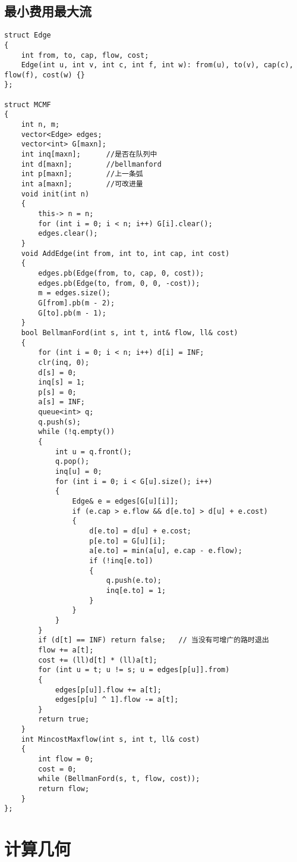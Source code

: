 \documentclass[a4]{article}
\begin{document}
\subsection{最小费用最大流}
\begin{lstlisting}
struct Edge
{
    int from, to, cap, flow, cost;
    Edge(int u, int v, int c, int f, int w): from(u), to(v), cap(c), flow(f), cost(w) {}
};

struct MCMF
{
    int n, m;
    vector<Edge> edges;
    vector<int> G[maxn];
    int inq[maxn];      //是否在队列中
    int d[maxn];        //bellmanford
    int p[maxn];        //上一条弧
    int a[maxn];        //可改进量
    void init(int n)
    {
        this-> n = n;
        for (int i = 0; i < n; i++) G[i].clear();
        edges.clear();
    }
    void AddEdge(int from, int to, int cap, int cost)
    {
        edges.pb(Edge(from, to, cap, 0, cost));
        edges.pb(Edge(to, from, 0, 0, -cost));
        m = edges.size();
        G[from].pb(m - 2);
        G[to].pb(m - 1);
    }
    bool BellmanFord(int s, int t, int& flow, ll& cost)
    {
        for (int i = 0; i < n; i++) d[i] = INF;
        clr(inq, 0);
        d[s] = 0;
        inq[s] = 1;
        p[s] = 0;
        a[s] = INF;
        queue<int> q;
        q.push(s);
        while (!q.empty())
        {
            int u = q.front();
            q.pop();
            inq[u] = 0;
            for (int i = 0; i < G[u].size(); i++)
            {
                Edge& e = edges[G[u][i]];
                if (e.cap > e.flow && d[e.to] > d[u] + e.cost)
                {
                    d[e.to] = d[u] + e.cost;
                    p[e.to] = G[u][i];
                    a[e.to] = min(a[u], e.cap - e.flow);
                    if (!inq[e.to])
                    {
                        q.push(e.to);
                        inq[e.to] = 1;
                    }
                }
            }
        }
        if (d[t] == INF) return false;   // 当没有可增广的路时退出
        flow += a[t];
        cost += (ll)d[t] * (ll)a[t];
        for (int u = t; u != s; u = edges[p[u]].from)
        {
            edges[p[u]].flow += a[t];
            edges[p[u] ^ 1].flow -= a[t];
        }
        return true;
    }
    int MincostMaxflow(int s, int t, ll& cost)
    {
        int flow = 0;
        cost = 0;
        while (BellmanFord(s, t, flow, cost));
        return flow;
    }
};
\end{lstlisting}
\clearpage\section{计算几何}
\end{document}
